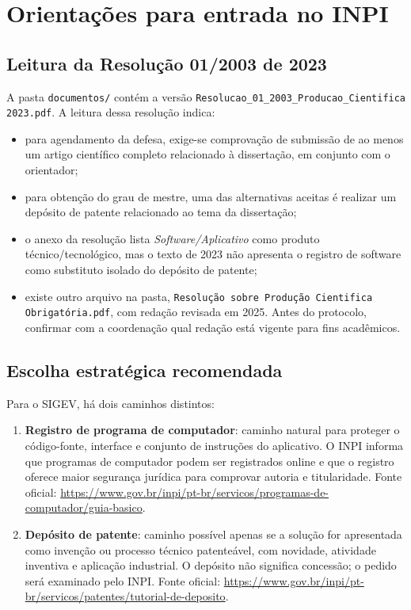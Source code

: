 \section{Orientações para entrada no INPI}

\subsection{Leitura da Resolução 01/2003 de 2023}

A pasta \texttt{documentos/} contém a versão \texttt{Resolucao\_01\_2003\_Producao\_Cientifica 2023.pdf}. A leitura dessa resolução indica:

\begin{itemize}
  \item para agendamento da defesa, exige-se comprovação de submissão de ao menos um artigo científico completo relacionado à dissertação, em conjunto com o orientador;
  \item para obtenção do grau de mestre, uma das alternativas aceitas é realizar um depósito de patente relacionado ao tema da dissertação;
  \item o anexo da resolução lista \textit{Software/Aplicativo} como produto técnico/tecnológico, mas o texto de 2023 não apresenta o registro de software como substituto isolado do depósito de patente;
  \item existe outro arquivo na pasta, \texttt{Resolução sobre Produção Cientifica Obrigatória.pdf}, com redação revisada em 2025. Antes do protocolo, confirmar com a coordenação qual redação está vigente para fins acadêmicos.
\end{itemize}

\subsection{Escolha estratégica recomendada}

Para o SIGEV, há dois caminhos distintos:

\begin{enumerate}
  \item \textbf{Registro de programa de computador}: caminho natural para proteger o código-fonte, interface e conjunto de instruções do aplicativo. O INPI informa que programas de computador podem ser registrados online e que o registro oferece maior segurança jurídica para comprovar autoria e titularidade. Fonte oficial: \url{https://www.gov.br/inpi/pt-br/servicos/programas-de-computador/guia-basico}.
  \item \textbf{Depósito de patente}: caminho possível apenas se a solução for apresentada como invenção ou processo técnico patenteável, com novidade, atividade inventiva e aplicação industrial. O depósito não significa concessão; o pedido será examinado pelo INPI. Fonte oficial: \url{https://www.gov.br/inpi/pt-br/servicos/patentes/tutorial-de-deposito}.
\end{enumerate}

